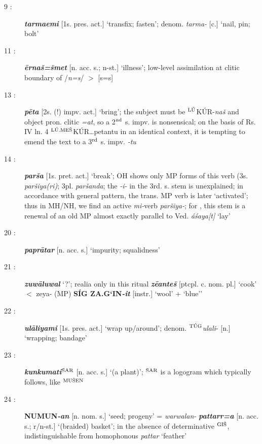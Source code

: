 \documentclass[10pt]{article}
\newcommand{\supersc}[1]{$^{\textrm{\scriptsize{#1}}}$}  	%
\newcommand{\bit}[1]{\textbf{\textit{#1}}}				%
\newcommand{\p}[1]{{\tiny[{#1}]}}					%
\newcommand{\hith}{\textsubwedge{h}}
\newcommand{\man}{\supersc{L\'U}}
\newcommand{\men}{\supersc{L\'U.ME\v{S}}}
\newcommand{\wood}{\supersc{GI\v{S}}}
\newcommand{\cloth}{\supersc{T\'UG}}
\renewcommand{\.}[1]{\textsubdot{#1}}
\begin{document}
\begin{description}
\item[9 :] \bit{tarmaemi} \p{1s. pres. act.} `transfix; fasten'; denom. \textit{tarma-} \p{c.} `nail, pin; bolt'

\item[11 :] \bit{\=erna\v{s}=\v{s}met} \p{n. acc. s.; n-st.} `illness'; low-level assimilation at clitic boundary of /\textit{n=s}/ $>$ [s=s]

\item[13 :] \bit{p\=eta} \p{2s. (!) impv. act.} `bring'; the subject must be {\man}K\'UR-\textit{na\v{s}} and object pron. clitic \textit{=at}, so a 2\supersc{nd} s. impv. is nonsensical; on the basis of Rs. IV ln. 4 {\men}K\'UR{\ldots}petantu in an identical context, it is tempting to emend the text to a 3\supersc{rd} s. impv. \textit{-tu}

\item[14 :] \bit{par\v{s}{\hith}a} \p{1s. pret. act.} `break'; OH shows only MP forms of this verb (3s. \textit{par\v{s}iya(ri)}; 3pl. \textit{par\v{s}anda}; the \textit{-i-} in the 3rd. s. stem is unexplained; in accordance with general pattern, the trans. MP verb is later `activated'; thus in MH/NH, we find an active \textit{mi-}verb \textit{par\v{s}iya-}; for \citet[70 n.138]{jasanoff2003verb}, this stem is a renewal of an old MP almost exactly parallel to Ved. \textit{\'a\'saya[t]} `lay'

\item[20 :] \bit{papr\=atar} \p{n. acc. s.} `impurity; squalidness'

\item[21 :] \bit{zuw\=aluwal} `?'; realia only in this ritual  \bit{z\=eante\v{s}} \p{ptcpl. c. nom. pl.} `cook' $<$ zeya- (MP) \textbf{S\'IG ZA.G`IN}\bit{-it} \p{instr.} `wool' + `blue''

\item[22 :] \bit{{\hith}ul\=aliyami} \p{1s. pres. act.} `wrap up/around'; denom. {\cloth}\textit{{\hith}ulali}- \p{n.} `wrapping; bandage'

\item[23 :] \bit{kunkumati}\textbf{\supersc{SAR}} \p{n. acc. s.} `(a plant)'; \supersc{SAR} is a logogram which typically follows, like \supersc{MU\v{S}EN}

\item[24 :] \textbf{NUMUN}\bit{-an} \p{n. nom. s.} `seed; progeny' = \textit{warwalan-} \bit{pattarr=a} \p{n. acc. s.; r/n-st.} `(braided) basket'; in the absence of determinative {\wood}, indistinguishable from homophonous \textit{pattar} `feather'


\end{description}
\end{document}
